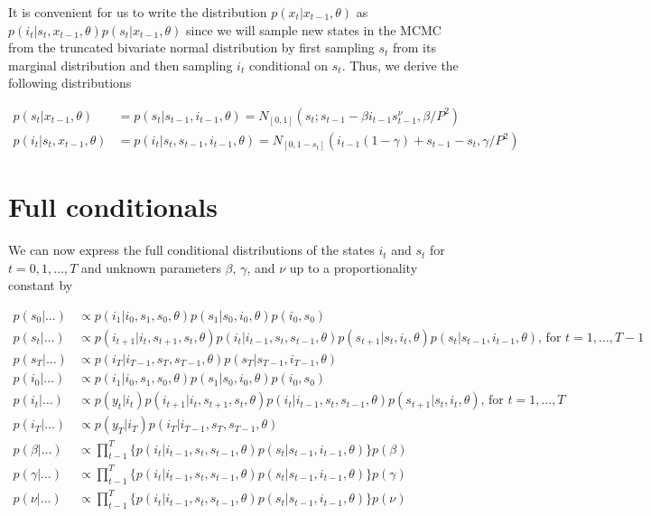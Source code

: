 \documentclass{article}
\begin{document}
It is convenient for us to write the distribution $p(x_t|x_{t-1},\theta)$ as $p(i_t|s_t,x_{t-1},\theta)p(s_t|x_{t-1},\theta)$ since we will sample new states in the MCMC from the truncated bivariate normal distribution by first sampling $s_t$ from its marginal distribution and then sampling $i_t$ conditional on $s_t$. Thus, we derive the following distributions

\begin{align*}
p(s_t|x_{t-1},\theta) &= p(s_t|s_{t-1},i_{t-1},\theta) = N_{[0,1]}(s_t; s_{t-1} - \beta i_{t-1}s^{\nu}_{t-1}, \beta / P^2) \\
p(i_t|s_t,x_{t-1},\theta) &= p(i_t|s_t,s_{t-1},i_{t-1},\theta) = N_{[0,1-s_t]}(i_{t-1}(1 - \gamma) + s_{t-1} - s_t, \gamma / P^2)
\end{align*}

\section{Full conditionals} \label{sec:fullcond}
We can now express the full conditional distributions of the states $i_t$ and $s_t$ for $t = 0, 1, \ldots, T$ and unknown parameters $\beta$, $\gamma$, and $\nu$ up to a proportionality constant by

\begin{align*}
p(s_0|\hdots) &\propto p(i_1|i_0,s_1,s_0,\theta)p(s_1|s_0,i_0,\theta)p(i_0,s_0)\\
p(s_t|\hdots) &\propto p(i_{t+1}|i_t,s_{t+1},s_t,\theta)p(i_t|i_{t-1},s_t,s_{t-1},\theta)p(s_{t+1}|s_t,i_t,\theta)p(s_t|s_{t-1},i_{t-1},\theta) \mbox{, for } t = 1,\ldots,T-1 \\
p(s_T|\hdots) &\propto p(i_T|i_{T-1},s_T,s_{T-1},\theta)p(s_T|s_{T-1},i_{T-1},\theta) \\
p(i_0|\hdots) &\propto p(i_1|i_0,s_1,s_0,\theta)p(s_1|s_0,i_0,\theta)p(i_0,s_0) \\
p(i_t|\hdots) &\propto p(y_t|i_t)p(i_{t+1}|i_t,s_{t+1},s_t,\theta)p(i_t|i_{t-1},s_t,s_{t-1},\theta)p(s_{t+1}|s_t,i_t,\theta) \mbox{, for } t = 1,\ldots,T \\
p(i_T|\hdots) &\propto p(y_T|i_T)p(i_T|i_{T-1},s_T,s_{T-1},\theta) \\
p(\beta|\hdots) &\propto \prod_{t-1}^T \{p(i_t|i_{t-1},s_t,s_{t-1},\theta)p(s_t|s_{t-1},i_{t-1},\theta)\}p(\beta) \\
p(\gamma|\hdots) &\propto \prod_{t-1}^T \{p(i_t|i_{t-1},s_t,s_{t-1},\theta)p(s_t|s_{t-1},i_{t-1},\theta)\}p(\gamma) \\
p(\nu|\hdots) &\propto \prod_{t-1}^T \{p(i_t|i_{t-1},s_t,s_{t-1},\theta)p(s_t|s_{t-1},i_{t-1},\theta)\}p(\nu)
\end{align*}
\end{document}
